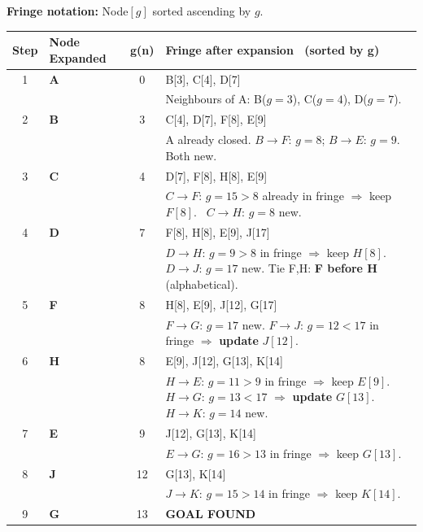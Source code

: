 \documentclass[12pt, a4paper]{article}
\newcommand{\goal}{\textcolor{green!55!black}{\textbf{GOAL FOUND}}}
\begin{document}
\textbf{Fringe notation:} Node$[g]$ sorted ascending by $g$.

\vspace{0.4em}
\begin{center}
\renewcommand{\arraystretch}{1.25}
\begin{tabular}{c|l|c|p{9.5cm}}
\toprule
\textbf{Step} & \textbf{Node Expanded} & \textbf{g(n)} &
\textbf{Fringe after expansion \ (sorted by g)} \\
\midrule
1 & \textbf{A} & 0
  & B[3], C[4], D[7] \\
  & & & \footnotesize Neighbours of A: B($g{=}3$), C($g{=}4$), D($g{=}7$). \\
\midrule
2 & \textbf{B} & 3
  & C[4], D[7], F[8], E[9] \\
  & & & \footnotesize A already closed. $B{\to}F$: $g{=}8$; $B{\to}E$: $g{=}9$. Both new.\\
\midrule
3 & \textbf{C} & 4
  & D[7], F[8], H[8], E[9] \\
  & & & \footnotesize $C{\to}F$: $g{=}15 > 8$ already in fringe $\Rightarrow$ keep $F[8]$. \
         $C{\to}H$: $g{=}8$ new. \\
\midrule
4 & \textbf{D} & 7
  & F[8], H[8], E[9], J[17] \\
  & & & \footnotesize $D{\to}H$: $g{=}9 > 8$ in fringe $\Rightarrow$ keep $H[8]$. \
         $D{\to}J$: $g{=}17$ new.
         Tie F,H: \textbf{F before H} (alphabetical). \\
\midrule
5 & \textbf{F} & 8
  & H[8], E[9], J[12], G[17] \\
  & & & \footnotesize $F{\to}G$: $g{=}17$ new. $F{\to}J$: $g{=}12 < 17$ in fringe
         $\Rightarrow$ \textbf{update} $J[12]$. \\
\midrule
6 & \textbf{H} & 8
  & E[9], J[12], G[13], K[14] \\
  & & & \footnotesize $H{\to}E$: $g{=}11 > 9$ in fringe $\Rightarrow$ keep $E[9]$. \
         $H{\to}G$: $g{=}13 < 17$ $\Rightarrow$ \textbf{update} $G[13]$. \
         $H{\to}K$: $g{=}14$ new. \\
\midrule
7 & \textbf{E} & 9
  & J[12], G[13], K[14] \\
  & & & \footnotesize $E{\to}G$: $g{=}16 > 13$ in fringe $\Rightarrow$ keep $G[13]$.\\
\midrule
8 & \textbf{J} & 12
  & G[13], K[14] \\
  & & & \footnotesize $J{\to}K$: $g{=}15 > 14$ in fringe $\Rightarrow$ keep $K[14]$.\\
\midrule
9 & \textbf{G} & 13
  & \goal \\
\bottomrule
\end{tabular}
\end{center}
\end{document}
